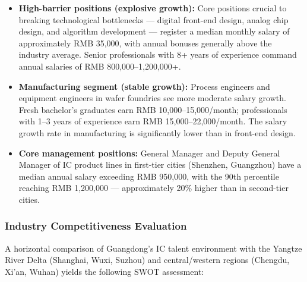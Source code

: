 \documentclass[12pt,a4paper]{article}
\begin{document}
\begin{itemize}
    \item \textbf{High-barrier positions (explosive growth):} Core positions
          crucial to breaking technological bottlenecks — digital front-end
          design, analog chip design, and algorithm development — register a
          median monthly salary of approximately RMB 35,000, with annual
          bonuses generally above the industry average. Senior professionals
          with 8+ years of experience command annual salaries of
          RMB 800,000--1,200,000+.
    \item \textbf{Manufacturing segment (stable growth):} Process engineers
          and equipment engineers in wafer foundries see more moderate salary
          growth. Fresh bachelor's graduates earn RMB 10,000--15,000/month;
          professionals with 1--3 years of experience earn RMB 15,000--22,000/month.
          The salary growth rate in manufacturing is significantly lower than
          in front-end design.
    \item \textbf{Core management positions:} General Manager and Deputy
          General Manager of IC product lines in first-tier cities (Shenzhen,
          Guangzhou) have a median annual salary exceeding RMB 950,000, with
          the 90th percentile reaching RMB 1,200,000 — approximately 20\%
          higher than in second-tier cities.
\end{itemize}

\subsubsection{Industry Competitiveness Evaluation}

A horizontal comparison of Guangdong's IC talent environment with the Yangtze
River Delta (Shanghai, Wuxi, Suzhou) and central/western regions (Chengdu,
Xi'an, Wuhan) yields the following SWOT assessment:
\end{document}
